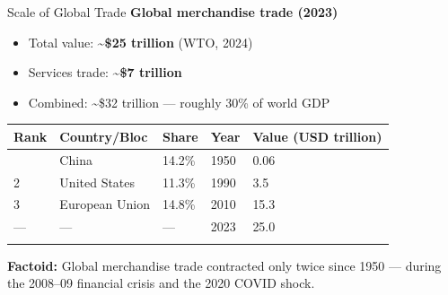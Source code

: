 \documentclass[
  ignorenonframetext,
  aspectratio=169,
]{beamer}
\makeatletter
\providecommand{\tightlist}{%
  \setlength{\itemsep}{0pt}\setlength{\parskip}{0pt}}
\let\quarto@originallabel\label
\DeclareRobustCommand*{\label}[1]{\quarto@originallabel{#1}}
\makeatother
\begin{document}
\begin{frame}{Scale of Global Trade}
\label{scale-of-global-trade}
\textbf{Global merchandise trade (2023)}

\begin{itemize}
\tightlist
\item
  Total value: \textbf{\textasciitilde\$25 trillion} (WTO, 2024)
\item
  Services trade: \textbf{\textasciitilde\$7 trillion}
\item
  Combined: \textasciitilde\$32 trillion --- roughly 30\% of world GDP
\end{itemize}

\begin{longtable}[]{@{}lllll@{}}
\toprule\noalign{}
Rank & Country/Bloc & Share & Year & Value (USD trillion) \\
\midrule\noalign{}
\endhead
1 & China & 14.2\% & 1950 & 0.06 \\
2 & United States & 11.3\% & 1990 & 3.5 \\
3 & European Union & 14.8\% & 2010 & 15.3 \\
--- & --- & --- & 2023 & 25.0 \\
\bottomrule\noalign{}
\end{longtable}

\textbf{Factoid:} Global merchandise trade contracted only twice since
1950 --- during the 2008--09 financial crisis and the 2020 COVID shock.
\end{frame}
\end{document}
